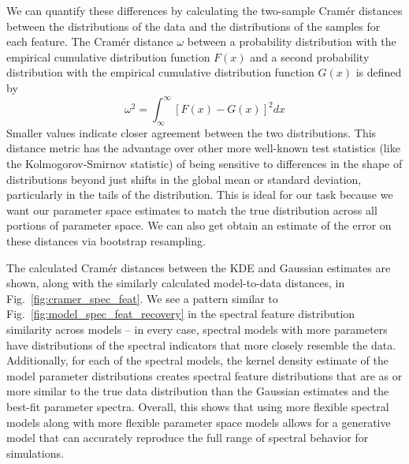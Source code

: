 
We can quantify these differences by calculating the two-sample Cram\'{e}r distances between the distributions of the data and the distributions of the samples for each feature. The Cram\'{e}r distance $\omega$ between a probability distribution with the empirical cumulative distribution function $F(x)$ and a second probability distribution with the empirical cumulative distribution function $G(x)$ is defined by
\begin{equation}
    \omega^2 = \displaystyle \int_\infty^\infty [F(x)-G(x)]^2 dx
\end{equation}
Smaller values indicate closer agreement between the two distributions. This distance metric has the advantage over other more well-known test statistics (like the Kolmogorov-Smirnov statistic) of being sensitive to differences in the shape of distributions beyond just shifts in the global mean or standard deviation, particularly in the tails of the distribution. This is ideal for our task because we want our parameter space estimates to match the true distribution across all portions of parameter space. We can also get obtain an estimate of the error on these distances via bootstrap resampling. 

The calculated Cram\'{e}r distances between the KDE and Gaussian estimates are shown, along with the similarly calculated model-to-data distances, in Fig.~\ref{fig:cramer_spec_feat}. We see a pattern similar to Fig.~\ref{fig:model_spec_feat_recovery} in the spectral feature distribution similarity across models -- in every case, spectral models with more parameters have distributions of the spectral indicators that more closely resemble the data. Additionally, for each of the spectral models, the kernel density estimate of the model parameter distributions creates spectral feature distributions that are as or more similar to the true data distribution than the Gaussian estimates and the best-fit parameter spectra. Overall, this shows that using more flexible spectral models along with more flexible parameter space models allows for a generative model that can accurately reproduce the full range of spectral behavior for simulations.

